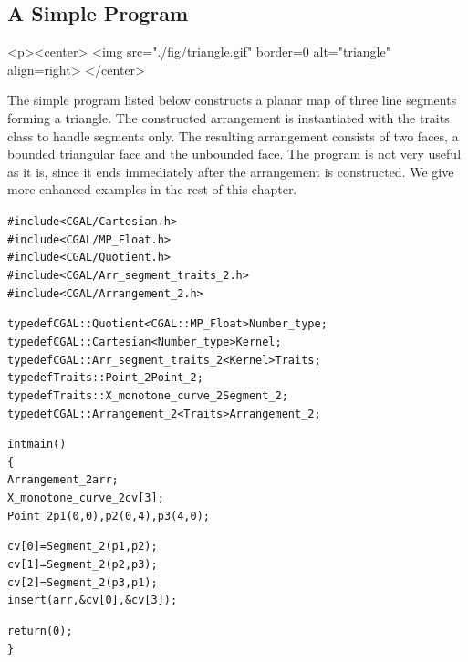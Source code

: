 \subsection{A Simple Program}

\lcTex{%
  \setlength{\widthRight}{1.6cm}
  \setlength{\widthLeft}{\widthLineReal}
  \addtolength{\widthLeft}{-\widthRight}
  \begin{minipage}{\widthLeft}
}
\begin{ccHtmlOnly}
  <p><center>
    <img src="./fig/triangle.gif" border=0 alt="triangle" align=right>
  </center>
\end{ccHtmlOnly}
The simple program listed below constructs a planar map of three line
segments forming a triangle. The constructed arrangement is instantiated
with the  traits class to handle segments only.
The resulting arrangement consists of two faces, a bounded triangular face
and the unbounded face.
The program is not very useful as it is, since it ends immediately
after the arrangement is constructed. We give more enhanced examples
in the rest of this chapter.

\begin{alltt}
#include <CGAL/Cartesian.h>
#include <CGAL/MP_Float.h>
#include <CGAL/Quotient.h>
#include <CGAL/Arr_segment_traits_2.h>
#include <CGAL/Arrangement_2.h>

typedef CGAL::Quotient<CGAL::MP_Float>     Number_type;
typedef CGAL::Cartesian<Number_type>       Kernel;
typedef CGAL::Arr_segment_traits_2<Kernel> Traits;
typedef Traits::Point_2                    Point_2;
typedef Traits::X_monotone_curve_2         Segment_2;
typedef CGAL::Arrangement_2<Traits>        Arrangement_2;

int main()
\{
  Arrangement_2       arr;
  X_monotone_curve_2  cv[3];
  Point_2             p1 (0, 0), p2 (0, 4), p3 (4, 0);
 
  cv[0] = Segment_2 (p1, p2);
  cv[1] = Segment_2 (p2, p3);
  cv[2] = Segment_2 (p3, p1);
  insert(arr, &cv[0], &cv[3]);

  return (0);
\}
\end{alltt}

